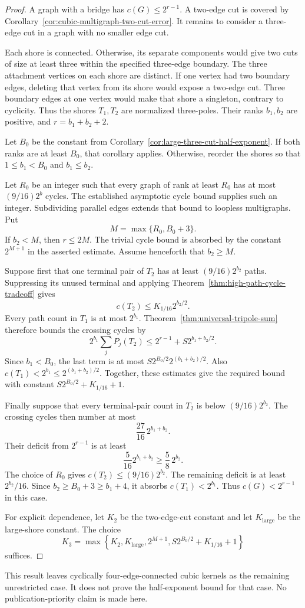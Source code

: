\begin{proof}
A graph with a bridge has $c(G)\le2^{r-1}$.
A two-edge cut is covered by Corollary~\ref{cor:cubic-multigraph-two-cut-error}.
It remains to consider a three-edge cut in a graph with no smaller edge cut.

Each shore is connected.
Otherwise, its separate components would give two cuts of size at least three within the specified three-edge boundary.
The three attachment vertices on each shore are distinct.
If one vertex had two boundary edges, deleting that vertex from its shore would expose a two-edge cut.
Three boundary edges at one vertex would make that shore a singleton, contrary to cyclicity.
Thus the shores $T_1,T_2$ are normalized three-poles.
Their ranks $b_1,b_2$ are positive, and $r=b_1+b_2+2$.

Let $B_0$ be the constant from Corollary~\ref{cor:large-three-cut-half-exponent}.
If both ranks are at least $B_0$, that corollary applies.
Otherwise, reorder the shores so that $1\le b_1<B_0$ and $b_1\le b_2$.

Let $R_0$ be an integer such that every graph of rank at least $R_0$ has at most $(9/16)2^b$ cycles.
The established asymptotic cycle bound supplies such an integer.
Subdividing parallel edges extends that bound to loopless multigraphs.
Put
\[
 M=\max\{R_0,B_0+3\}.
\]
If $b_2<M$, then $r\le2M$.
The trivial cycle bound is absorbed by the constant $2^{M+1}$ in the asserted estimate.
Assume henceforth that $b_2\ge M$.

Suppose first that one terminal pair of $T_2$ has at least $(9/16)2^{b_2}$ paths.
Suppressing its unused terminal and applying Theorem~\ref{thm:high-path-cycle-tradeoff} gives
\[
 c(T_2)\le K_{1/16}2^{b_2/2}.
\]
Every path count in $T_1$ is at most $2^{b_1}$.
Theorem~\ref{thm:universal-tripole-sum} therefore bounds the crossing cycles by
\[
 2^{b_1}\sum_jP_j(T_2)
 \le2^{r-1}+S2^{b_1+b_2/2}.
\]
Since $b_1<B_0$, the last term is at most
$S2^{B_0/2}2^{(b_1+b_2)/2}$.
Also $c(T_1)<2^{b_1}\le2^{(b_1+b_2)/2}$.
Together, these estimates give the required bound with constant
$S2^{B_0/2}+K_{1/16}+1$.

Finally suppose that every terminal-pair count in $T_2$ is below $(9/16)2^{b_2}$.
The crossing cycles then number at most
\[
 \frac{27}{16}\,2^{b_1+b_2}.
\]
Their deficit from $2^{r-1}$ is at least
\[
 \frac5{16}2^{b_1+b_2}\ge\frac58\,2^{b_2}.
\]
The choice of $R_0$ gives $c(T_2)\le(9/16)2^{b_2}$.
The remaining deficit is at least $2^{b_2}/16$.
Since $b_2\ge B_0+3\ge b_1+4$, it absorbs $c(T_1)<2^{b_1}$.
Thus $c(G)<2^{r-1}$ in this case.

For explicit dependence, let $K_2$ be the two-edge-cut constant and let $K_{\mathrm{large}}$ be the large-shore constant.
The choice
\[
 K_3=\max\left\{
 K_2,K_{\mathrm{large}},2^{M+1},
 S2^{B_0/2}+K_{1/16}+1
 \right\}
\]
suffices.
\end{proof}

This result leaves cyclically four-edge-connected cubic kernels as the remaining unrestricted case.
It does not prove the half-exponent bound for that case.
No publication-priority claim is made here.
